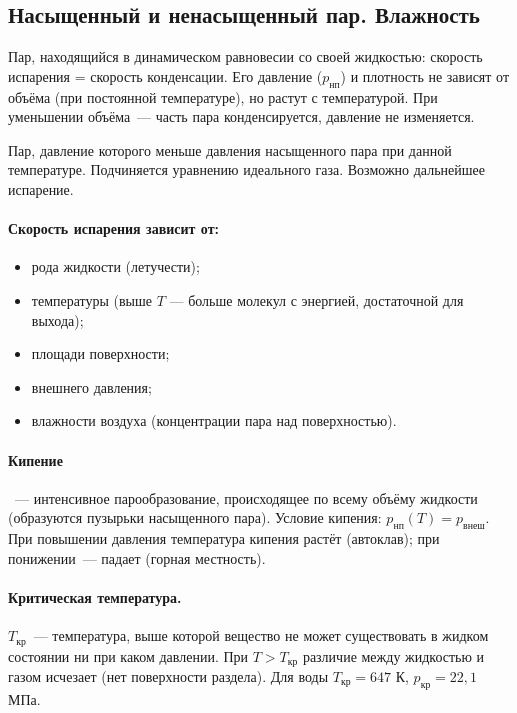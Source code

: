 \documentclass[12pt]{article}
\begin{document}
\subsection{Насыщенный и ненасыщенный пар. Влажность}

\begin{definition}
	Пар, находящийся в динамическом равновесии со своей жидкостью: скорость испарения = скорость конденсации. Его давление ($p_{\text{нп}}$) и плотность не зависят от объёма (при постоянной температуре), но растут с температурой. При уменьшении объёма~--- часть пара конденсируется, давление не изменяется.
\end{definition}

\begin{definition}
	Пар, давление которого меньше давления насыщенного пара при данной температуре. Подчиняется уравнению идеального газа. Возможно дальнейшее испарение.
\end{definition}

\paragraph{Скорость испарения зависит от:}
\begin{itemize}
	\item рода жидкости (летучести);
	\item температуры (выше $T$ --- больше молекул с энергией, достаточной для выхода);
	\item площади поверхности;
	\item внешнего давления;
	\item влажности воздуха (концентрации пара над поверхностью).
\end{itemize}

\paragraph{Кипение}~--- интенсивное парообразование, происходящее по всему объёму жидкости (образуются пузырьки насыщенного пара). Условие кипения: $p_{\text{нп}}(T) = p_{\text{внеш}}$. При повышении давления температура кипения растёт (автоклав); при понижении~--- падает (горная местность).

\paragraph{Критическая температура.}
$T_{\text{кр}}$~--- температура, выше которой вещество не может существовать в жидком состоянии ни при каком давлении. При $T > T_{\text{кр}}$ различие между жидкостью и газом исчезает (нет поверхности раздела). Для воды $T_{\text{кр}} = 647$ К, $p_{\text{кр}} = 22{,}1$ МПа.
\end{document}
